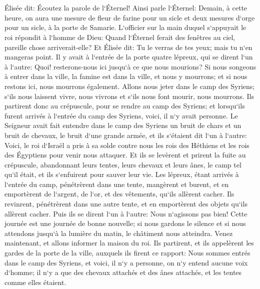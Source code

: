 \chapter{}

\verse Élisée dit: Écoutez la parole de l`Éternel! Ainsi parle l`Éternel: Demain, à cette heure, on aura une mesure de fleur de farine pour un sicle et deux mesures d`orge pour un sicle, à la porte de Samarie. 
\verse L`officier sur la main duquel s`appuyait le roi répondit à l`homme de Dieu: Quand l`Éternel ferait des fenêtres au ciel, pareille chose arriverait-elle? Et Élisée dit: Tu le verras de tes yeux; mais tu n`en mangeras point. 
\verse Il y avait à l`entrée de la porte quatre lépreux, qui se dirent l`un à l`autre: Quoi! resterons-nous ici jusqu`à ce que nous mourions? 
\verse Si nous songeons à entrer dans la ville, la famine est dans la ville, et nous y mourrons; et si nous restons ici, nous mourrons également. Allons nous jeter dans le camp des Syriens; s`ils nous laissent vivre, nous vivrons et s`ils nous font mourir, nous mourrons. 
\verse Ils partirent donc au crépuscule, pour se rendre au camp des Syriens; et lorsqu`ils furent arrivés à l`entrée du camp des Syriens, voici, il n`y avait personne. 
\verse Le Seigneur avait fait entendre dans le camp des Syriens un bruit de chars et un bruit de chevaux, le bruit d`une grande armée, et ils s`étaient dit l`un à l`autre: Voici, le roi d`Israël a pris à sa solde contre nous les rois des Héthiens et les rois des Égyptiens pour venir nous attaquer. 
\verse Et ils se levèrent et prirent la fuite au crépuscule, abandonnant leurs tentes, leurs chevaux et leurs ânes, le camp tel qu`il était, et ils s`enfuirent pour sauver leur vie. 
\verse Les lépreux, étant arrivés à l`entrée du camp, pénétrèrent dans une tente, mangèrent et burent, et en emportèrent de l`argent, de l`or, et des vêtements, qu`ils allèrent cacher. Ils revinrent, pénétrèrent dans une autre tente, et en emportèrent des objets qu`ils allèrent cacher. 
\verse Puis ils se dirent l`un à l`autre: Nous n`agissons pas bien! Cette journée est une journée de bonne nouvelle; si nous gardons le silence et si nous attendons jusqu`à la lumière du matin, le châtiment nous atteindra. Venez maintenant, et allons informer la maison du roi. 
\verse Ils partirent, et ils appelèrent les gardes de la porte de la ville, auxquels ils firent ce rapport: Nous sommes entrés dans le camp des Syriens, et voici, il n`y a personne, on n`y entend aucune voix d`homme; il n`y a que des chevaux attachés et des ânes attachés, et les tentes comme elles étaient. 
